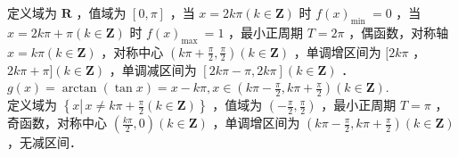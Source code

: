 \documentclass[10pt]{article}
\begin{document}
定义域为 \(\mathbf{R}\) ，值域为 \([0, \pi]\) ，当 \(x=2 k \pi(k \in \mathbf{Z})\) 时 \(f(x)_{\text {min }}=0\) ，当 \(x=2 k \pi+\pi(k \in \mathbf{Z})\) 时 \(f(x)_{\text {max }}=1\) ，最小正周期 \(T=2 \pi\) ，偶函数，对称轴 \(x=k \pi(k \in \mathbf{Z})\) ，对称中心 \(\left(k \pi+\frac{\pi}{2}, \frac{\pi}{2}\right)(k \in \mathbf{Z})\) ，单调增区间为 \([2 k \pi\) ， \(2 k \pi+\pi](k \in \mathbf{Z})\) ，单调减区间为 \([2 k \pi-\pi, 2 k \pi](k \in \mathbf{Z})\) ．\\
\(g(x)=\arctan (\tan x)=x-k \pi, x \in\left(k \pi-\frac{\pi}{2}, k \pi+\frac{\pi}{2}\right)(k \in \mathbf{Z})\).\\
定义域为 \(\left\{x \left\lvert\, x \neq k \pi+\frac{\pi}{2}(k \in \mathbf{Z})\right.\right\}\) ，值域为 \(\left(-\frac{\pi}{2}, \frac{\pi}{2}\right)\) ，最小正周期 \(T=\pi\) ，奇函数，对称中心 \(\left(\frac{k \pi}{2}, 0\right)(k \in \mathbf{Z})\) ，单调增区间为 \(\left(k \pi-\frac{\pi}{2}, k \pi+\frac{\pi}{2}\right)(k \in \mathbf{Z})\) ，无减区间．
\end{document}

